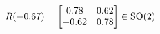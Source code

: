 \documentclass[preview]{standalone}
\begin{document}
\begin{align*}
\special{dvisvgm:raw <g id='unique000'>}R(-0.67) = \begin{bmatrix} 0.78 & 0.62 \\ -0.62 & 0.78 \end{bmatrix} \in \text{SO}(2)\special{dvisvgm:raw </g>}
\end{align*}
\end{document}
